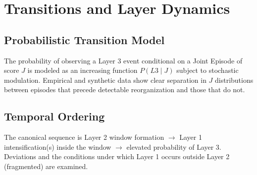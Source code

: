\section{Transitions and Layer Dynamics}

\subsection{Probabilistic Transition Model}

The probability of observing a Layer 3 event conditional on a Joint Episode of score $J$ is modeled as an increasing function $P(L3 \mid J)$ subject to stochastic modulation. Empirical and synthetic data show clear separation in $J$ distributions between episodes that precede detectable reorganization and those that do not.

\subsection{Temporal Ordering}

The canonical sequence is Layer 2 window formation $\to$ Layer 1 intensification(s) inside the window $\to$ elevated probability of Layer 3. Deviations and the conditions under which Layer 1 occurs outside Layer 2 (fragmented) are examined.
